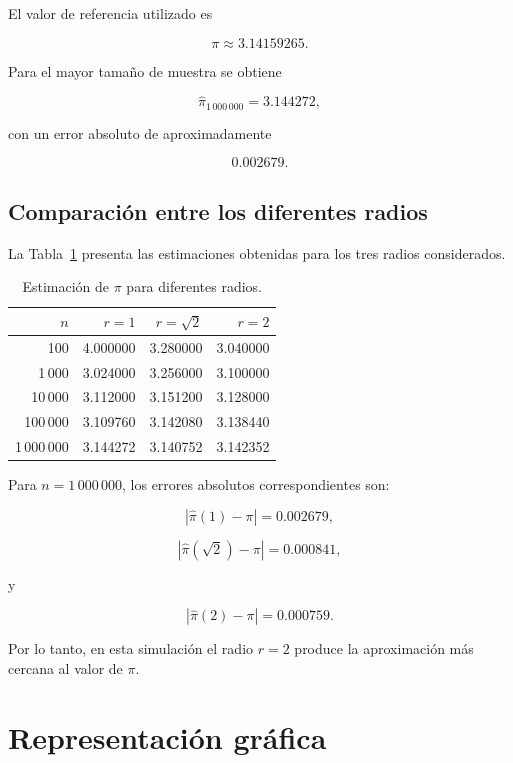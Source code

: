 \documentclass[12pt,a4paper]{article}
\begin{document}
El valor de referencia utilizado es

\[
\pi\approx3.14159265.
\]

Para el mayor tamaño de muestra se obtiene

\[
\widehat{\pi}_{1\,000\,000}
=
3.144272,
\]

con un error absoluto de aproximadamente

\[
0.002679.
\]

\subsection{Comparación entre los diferentes radios}

La Tabla~\ref{tab:radios} presenta las estimaciones obtenidas para los
tres radios considerados.

\begin{table}[H]
\centering
\caption{Estimación de \(\pi\) para diferentes radios.}
\label{tab:radios}

\begin{tabular}{rrrr}
\toprule
\(n\) & \(r=1\) & \(r=\sqrt{2}\) & \(r=2\) \\
\midrule
100 & 4.000000 & 3.280000 & 3.040000 \\
1\,000 & 3.024000 & 3.256000 & 3.100000 \\
10\,000 & 3.112000 & 3.151200 & 3.128000 \\
100\,000 & 3.109760 & 3.142080 & 3.138440 \\
1\,000\,000 & 3.144272 & 3.140752 & 3.142352 \\
\bottomrule
\end{tabular}

\end{table}

Para \(n=1\,000\,000\), los errores absolutos correspondientes son:

\[
\left|\widehat{\pi}(1)-\pi\right|
=
0.002679,
\]

\[
\left|\widehat{\pi}(\sqrt{2})-\pi\right|
=
0.000841,
\]

y

\[
\left|\widehat{\pi}(2)-\pi\right|
=
0.000759.
\]

Por lo tanto, en esta simulación el radio \(r=2\) produce la
aproximación más cercana al valor de \(\pi\).


\section{Representación gráfica}
\end{document}
